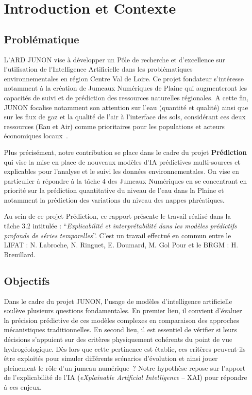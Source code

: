 \section{Introduction et Contexte}
\label{sec:intro}

\subsection{Problématique}

L'ARD JUNON vise à développer un Pôle de recherche et d'excellence sur l'utilisation de l'Intelligence Artificielle dans les problématiques environnementales en région Centre Val de Loire. Ce projet fondateur s'intéresse notamment à la création de Jumeaux Numériques de Plaine qui augmenteront les capacités de suivi et de prédiction des ressources naturelles régionales. A cette fin, JUNON focalise notamment son attention sur l'eau (quantité et qualité) ainsi que sur les flux de gaz et la qualité de l'air à l'interface des sols, considérant ces deux ressources (Eau et Air) comme prioritaires pour les populations et acteurs économiques locaux~\cite{lifat_junon}.

Plus précisément, notre contribution se place dans le cadre du projet \textbf{Prédiction} qui vise la mise en place de nouveaux modèles d'IA prédictives multi-sources et explicables pour l'analyse et le suivi les données environnementales. On vise en particulier à répondre à la tâche 4 des Jumeaux Numériques en se concentrant en priorité sur la prédiction quantitative du niveau de l'eau dans la Plaine et notamment la prédiction des variations du niveau des nappes phréatiques.

Au sein de ce projet Prédiction, ce rapport présente le travail réalisé dans la tâche 3.2 intitulée : ``\emph{Explicabilité et interprétabilité dans les modèles prédictifs profonds de séries temporelles}''. C'est un travail effectué en commun entre le LIFAT : N. Labroche, N. Ringuet, E. Doumard, M. Gol Pour et le BRGM : H. Breuillard.

\subsection{Objectifs}

Dans le cadre du projet JUNON, l'usage de modèles d'intelligence artificielle soulève plusieurs questions fondamentales. En premier lieu, il convient d'évaluer la précision prédictive de ces modèles complexes en comparaison des approches mécanistiques traditionnelles. En second lieu, il est essentiel de vérifier si leurs décisions s'appuient sur des critères physiquement cohérents du point de vue hydrogéologique. Dès lors que cette pertinence est établie, ces critères peuvent-ils être exploités pour simuler différents scénarios d'évolution et ainsi jouer pleinement le rôle d'un jumeau numérique~? Notre hypothèse repose sur l'apport de l'explicabilité de l'IA (\textit{eXplainable Artificial Intelligence} -- XAI) \cite{miller2019explanation, nauta2023anecdotal} pour répondre à ces enjeux.

